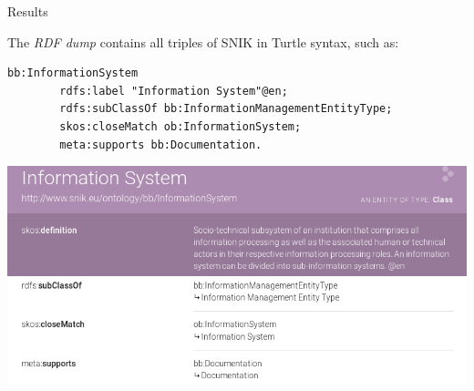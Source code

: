 \documentclass[portrait,final,a0paper,fontscale=0.310]{imiseposter}
\begin{document}
\begin{poster}
\begin{posterbox}[name=results,column=1]{Results}
\begin{tcolorbox}[colback=white,colframe=mediblue,title=RDF Dump~~\url{http://www.snik.eu/download/snik-0.8.zip}]
The \emph{RDF dump} contains all triples of SNIK in Turtle syntax, such as:
\begin{lstlisting}[basicstyle=\ttfamily]
bb:InformationSystem
        rdfs:label "Information System"@en;
        rdfs:subClassOf bb:InformationManagementEntityType;
        skos:closeMatch ob:InformationSystem;
        meta:supports bb:Documentation.
\end{lstlisting}
\vspace{-1.0em}
\end{tcolorbox}
\vspace{-0.5em}

\begin{tcolorbox}[colback=white,colframe=mediblue,title=LodLive RDF Browser~~~~~~~~~~~~~\url{http://www.snik.eu/ontology}]
\includegraphics[width=\textwidth]{img/lodlive.png}
\vspace{-1.0em}
\end{tcolorbox}
\vspace{-0.5em}


\end{posterbox}
\end{poster}
\end{document}
